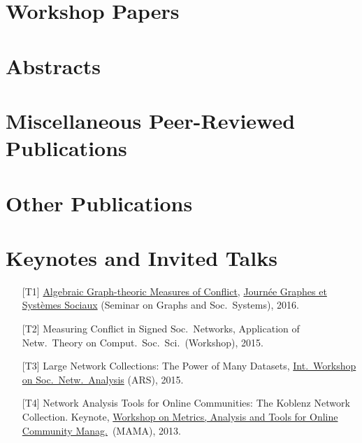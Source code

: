 \documentclass[line,mm]{res}
\newcounter{x}
\begin{document}
\begin{resume}
\section{Workshop Papers}    
\section{Abstracts}          
\section{Miscellaneous Peer-Reviewed Publications}	
\section{Other Publications} 

\section{Keynotes and Invited Talks}
\begin{itemize}
\item[{[T1]}] \href{https://www.slideshare.net/kunegis/algebraic-graphtheoretic-measures-of-conflict}{Algebraic Graph-theoric Measures of Conflict}, 
  \href{http://jgss.sciencesconf.org/}{Journée Graphes et Systèmes
    Sociaux} (Seminar on Graphs and Soc.\ Systems), 2016.  
\item[{[T2]}] Measuring Conflict in Signed Soc.\ Networks, 
  Application of Netw.\ Theory on Comput.\ Soc.\ Sci.\ (Workshop), 2015.
\item[{[T3]}] Large Network Collections:  The Power of Many Datasets,
  \href{http://www.ars15.unisa.it/}{Int.\ Workshop on Soc.\ Netw.\ Analysis} (ARS), 2015. 
\item[{[T4]}] Network Analysis Tools for Online Communities: The Koblenz Network
  Collection. Keynote, \href{http://mama.west.uni-koblenz.de/}{Workshop
    on Metrics, Analysis and Tools for Online Community Manag.}\ (MAMA), 2013.  
\end{itemize}


\end{resume}
\end{document}

